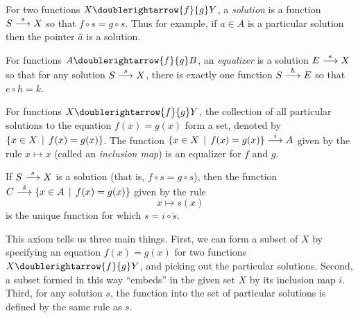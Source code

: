 \begin{defn}\label{def:equalizer} 
	For two functions $X\doublerightarrow{f}{g} Y$, a \emph{solution} is a function $\sfromto sSX$ so that 
	$f\circ s = g\circ s$.
	Thus for example, if $a\in A$ is a particular solution then the pointer $\hat a$ is a solution.

	For functions $A\doublerightarrow{f}{g} B$, an \emph{equalizer} is a solution $\sfromto eEX$ so that for any solution $\sfromto sSX$, there is exactly one function $\sfromto hSE$ so that $e\circ h = k$.
\end{defn}

\begin{principle}
	For functions $X\doublerightarrow{f}{g} Y$, the collection of all particular solutions to the equation $f(x)=g(x)$ form a set, denoted by $\{x\in X\st f(x) = g(x)\}$. 	
	The function $\sfromto i{\{x\in X\st f(x)=g(x)\}}A$ given by the rule $x\mapsto x$ (called an \emph{inclusion map}) is an equalizer for $f$ and $g$.
	
	If $\sfromto sSX$ is a solution (that is, $f\circ s = g\circ s$),
	then the function $\sfromto {\check s}C{\{x\in A\st f(x)=g(x)\}}$ given by the rule 
	\[x\mapsto s(x)\]
	is the unique function for which $s = i\circ \check s$.
\end{principle}

This axiom tells us three main things.
First, we can form a subset of $X$ by specifying an equation $f(x)=g(x)$ for two functions $X\doublerightarrow{f}{g}Y$, and picking out the particular solutions.
Second, a subset formed in this way ``embeds'' in the given set $X$ by its inclusion map $i$.
Third, for any solution $s$, the function into the set of particular solutions is defined by the same rule as $s$.

